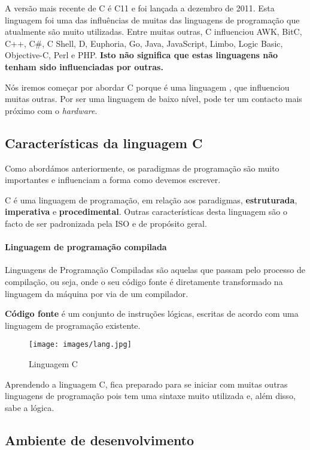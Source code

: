 A versão mais recente de C é C11 e foi lançada a dezembro de 2011. Esta linguagem foi uma das influências de muitas das linguagens de programação que atualmente são muito utilizadas. Entre muitas outras, C influenciou AWK, BitC, C++, C\#, C Shell, D, Euphoria, Go, Java, JavaScript, Limbo, Logic Basic, Objective-C, Perl e PHP. \textbf{Isto não significa que estas linguagens não tenham sido influenciadas por outras.}

Nós iremos começar por abordar C porque é uma linguagem , que influenciou muitas outras. Por ser uma linguagem de baixo nível, pode ter um contacto mais próximo com o \textit{hardware}.

\subsection{Características da linguagem C}

Como abordámos anteriormente, os paradigmas de programação são muito importantes e influenciam a forma como devemos escrever.

C é uma linguagem de programação, em relação aos paradigmas, \textbf{estruturada}, \textbf{imperativa} e \textbf{procedimental}. Outras características desta linguagem são o facto de ser padronizada pela ISO e de propósito geral.

\paragraph{Linguagem de programação compilada}

Linguagens de Programação Compiladas são aquelas que passam pelo processo de compilação, ou seja, onde o seu código fonte é diretamente transformado na linguagem da máquina por via de um compilador.

\begin{defi}
\textbf{Código fonte} é um conjunto de instruções lógicas, escritas de acordo com uma linguagem de programação existente.
\end{defi}

\begin{figure}[!h]
\center\texttt{[image: images/lang.jpg]}
\caption{Linguagem C}
\end{figure}

Aprendendo a linguagem C, fica preparado para se iniciar com muitas outras linguagens de programação pois tem uma sintaxe muito utilizada e, além disso, sabe a lógica.

\subsection{Ambiente de desenvolvimento}

